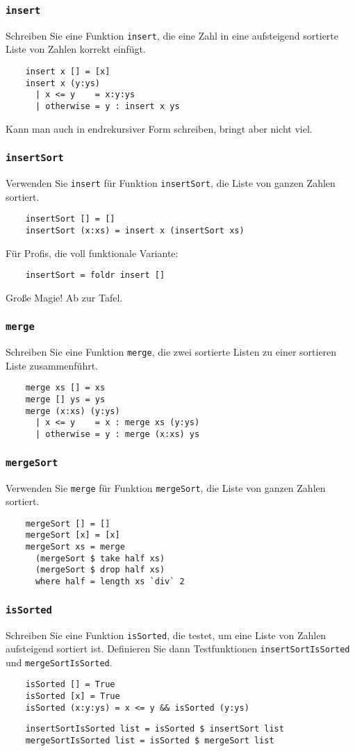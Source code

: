 \documentclass{beamer}
\begin{document}
\begin{frame}[fragile]
  \frametitle{\lstinline{insert}}
  Schreiben Sie eine Funktion \lstinline{insert}, die eine Zahl in eine aufsteigend sortierte Liste von Zahlen korrekt einfügt.
  \pause
  \begin{lstlisting}
    insert x [] = [x]
    insert x (y:ys)
      | x <= y    = x:y:ys
      | otherwise = y : insert x ys
  \end{lstlisting}
  Kann man auch in endrekursiver Form schreiben, bringt aber nicht viel.
\end{frame}

\begin{frame}[fragile]
  \frametitle{\lstinline{insertSort}}
  Verwenden Sie \lstinline{insert} für Funktion \lstinline{insertSort}, die Liste von ganzen Zahlen sortiert.
  \pause
  \begin{lstlisting}
    insertSort [] = []
    insertSort (x:xs) = insert x (insertSort xs)
  \end{lstlisting}
  \pause
  Für Profis, die voll funktionale Variante:
  \pause
  \begin{lstlisting}
    insertSort = foldr insert []
  \end{lstlisting}
  Große Magie! Ab zur Tafel.
\end{frame}

\begin{frame}[fragile]
  \frametitle{\lstinline{merge}}
  Schreiben Sie eine Funktion \lstinline{merge}, die zwei sortierte Listen zu einer sortieren Liste zusammenführt.
  \pause
  \begin{lstlisting}
    merge xs [] = xs
    merge [] ys = ys
    merge (x:xs) (y:ys)
      | x <= y    = x : merge xs (y:ys)
      | otherwise = y : merge (x:xs) ys
  \end{lstlisting}
\end{frame}

\begin{frame}[fragile]
  \frametitle{\lstinline{mergeSort}}
  Verwenden Sie \lstinline{merge} für Funktion \lstinline{mergeSort}, die Liste von ganzen Zahlen sortiert.
  \pause
  \begin{lstlisting}
    mergeSort [] = []
    mergeSort [x] = [x]
    mergeSort xs = merge
      (mergeSort $ take half xs)
      (mergeSort $ drop half xs)
      where half = length xs `div` 2
  \end{lstlisting}
\end{frame}

\begin{frame}[fragile]
  \frametitle{\lstinline{isSorted}}
  Schreiben Sie eine Funktion \lstinline{isSorted}, die testet, um eine Liste von Zahlen aufsteigend sortiert ist.
  Definieren Sie dann Testfunktionen \lstinline{insertSortIsSorted} und \lstinline{mergeSortIsSorted}.
  \pause
  \begin{lstlisting}
    isSorted [] = True
    isSorted [x] = True
    isSorted (x:y:ys) = x <= y && isSorted (y:ys)
  \end{lstlisting}
  \pause
  \begin{lstlisting}
    insertSortIsSorted list = isSorted $ insertSort list
    mergeSortIsSorted list = isSorted $ mergeSort list
  \end{lstlisting}
\end{frame}
\end{document}
